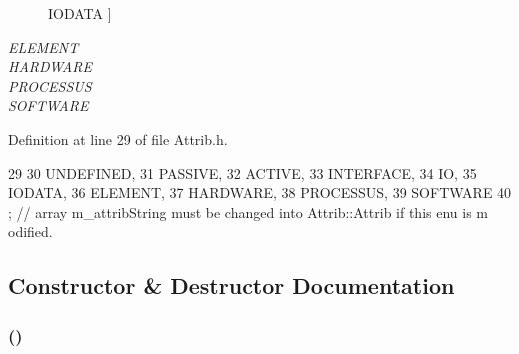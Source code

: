 \begin{Desc}
\begin{description}
{\hypertarget{classAttrib_a69e171d7cc6417835a5a306d3c764235a0af3b0d0ac323c1704e6c69cf90add28}{
IODATA}
\label{classAttrib_a69e171d7cc6417835a5a306d3c764235a0af3b0d0ac323c1704e6c69cf90add28}
}]\item[{\em 
\hypertarget{classAttrib_a69e171d7cc6417835a5a306d3c764235a7788bc5dd333fd8ce18562b269c9dab1}{
ELEMENT}
\label{classAttrib_a69e171d7cc6417835a5a306d3c764235a7788bc5dd333fd8ce18562b269c9dab1}
}]\item[{\em 
\hypertarget{classAttrib_a69e171d7cc6417835a5a306d3c764235a61ceb22149f365f1780d18f9d1459423}{
HARDWARE}
\label{classAttrib_a69e171d7cc6417835a5a306d3c764235a61ceb22149f365f1780d18f9d1459423}
}]\item[{\em 
\hypertarget{classAttrib_a69e171d7cc6417835a5a306d3c764235a75250e29692496e73effca2c0330977f}{
PROCESSUS}
\label{classAttrib_a69e171d7cc6417835a5a306d3c764235a75250e29692496e73effca2c0330977f}
}]\item[{\em 
\hypertarget{classAttrib_a69e171d7cc6417835a5a306d3c764235a103a67cd0b8f07ef478fa45d4356e27b}{
SOFTWARE}
\label{classAttrib_a69e171d7cc6417835a5a306d3c764235a103a67cd0b8f07ef478fa45d4356e27b}
}]\end{description}
\end{Desc}



Definition at line 29 of file Attrib.h.


\begin{DoxyCode}
29                 {
30     UNDEFINED,
31     PASSIVE,
32     ACTIVE,
33     INTERFACE,
34     IO,
35     IODATA,
36     ELEMENT,
37     HARDWARE,
38     PROCESSUS,
39     SOFTWARE 
40   }; // array m_attribString must be changed into Attrib::Attrib if this enu is m
      odified. 
\end{DoxyCode}


\subsection{Constructor \& Destructor Documentation}
\hypertarget{classCroc_ac9997a70a0b5b197789f6e2ba80b498b}{
\subsubsection[{Croc}]{ ()}}
\label{classCroc_ac9997a70a0b5b197789f6e2ba80b498b}


